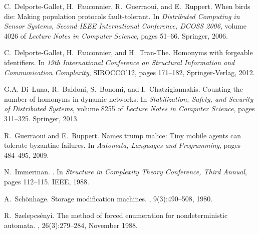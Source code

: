 \documentclass[UKenglish]{llncs}
\begin{document}
\begin{thebibliography}{10}
C.~Delporte-Gallet, H.~Fauconnier, R.~Guerraoui, and E.~Ruppert.
\newblock When birds die: Making population protocols fault-tolerant.
\newblock In {\em Distributed Computing in Sensor Systems, Second {IEEE}
  International Conference, {DCOSS} 2006}, volume 4026 of {\em Lecture Notes in Computer
  Science}, pages 51--66. Springer, 2006.

C.~Delporte-Gallet, H.~Fauconnier, and H.~Tran-The.
\newblock Homonyms with forgeable identifiers.
\newblock In {\em   19th International Conference on
  Structural Information and Communication Complexity}, SIROCCO'12, pages
  171--182, Springer-Verlag, 2012. 

G.A. Di~Luna, R.~Baldoni, S.~Bonomi, and I.~Chatzigiannakis.
\newblock Counting the number of homonyms in dynamic networks.
\newblock In {\em Stabilization, Safety,
  and Security of Distributed Systems}, volume 8255 of {\em Lecture Notes in
  Computer Science}, pages 311--325. Springer, 2013.

R.~Guerraoui and E.~Ruppert.
\newblock Names trump malice: Tiny mobile agents can tolerate byzantine
  failures.
\newblock In {\em Automata, Languages and Programming}, pages 484--495, 2009.

N.~Immerman.
.
\newblock In {\em Structure in Complexity Theory Conference,  Third Annual}, pages 112--115. IEEE, 1988.

A.~Sch{\"o}nhage.
\newblock Storage modification machines.
, 9(3):490--508, 1980.

R.~Szelepcs{\'e}nyi.
\newblock The method of forced enumeration for nondeterministic automata.
, 26(3):279--284, November 1988.

\end{thebibliography}
 
\end{document}
